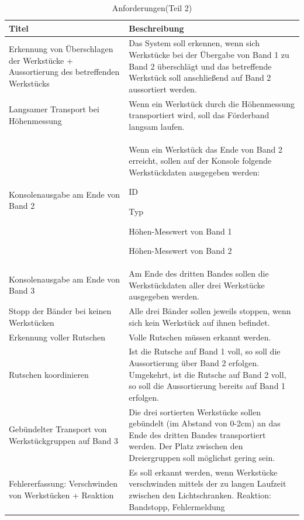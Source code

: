 \documentclass[a4paper, 11pt]{article}
\begin{document}
\newpage

\begin{table}[h]
\center
\begin{tabularx}{\textwidth}{|X|X|}
\hline
\textbf{Titel}&\textbf{Beschreibung}\\
\hline
Erkennung von Überschlagen der Werkstücke + Aussortierung des betreffenden Werkstücks&Das System soll erkennen, wenn sich Werkstücke bei der Übergabe von Band 1 zu Band 2 überschlägt und das betreffende Werkstück soll anschließend auf Band 2 aussortiert werden.\\
\hline
Langsamer Transport bei Höhenmessung&Wenn ein Werkstück durch die Höhenmessung transportiert wird, soll das Förderband langsam laufen.\\
\hline
Konsolenausgabe am Ende von Band 2&Wenn ein Werkstück das Ende von Band 2 erreicht, sollen auf der Konsole folgende Werkstückdaten ausgegeben werden:
\begin{compactenum}[-]
\item ID 
\item Typ 
\item Höhen-Messwert von Band 1 
\item Höhen-Messwert von Band 2 
\end{compactenum}\\
\hline
Konsolenausgabe am Ende von Band 3&Am Ende des dritten Bandes sollen die Werkstückdaten aller drei Werkstücke ausgegeben werden.\\
\hline
Stopp der Bänder bei keinen Werkstücken&Alle drei Bänder sollen jeweils stoppen, wenn sich kein Werkstück auf ihnen befindet.\\
\hline
Erkennung voller Rutschen&Volle Rutschen müssen erkannt werden.\\
\hline
Rutschen koordinieren&Ist die Rutsche auf Band 1 voll, so soll die Aussortierung über Band 2 erfolgen. Umgekehrt, ist die Rutsche auf Band 2 voll, so soll die Aussortierung bereits auf Band 1 erfolgen.\\
\hline
Gebündelter Transport von Werkstückgruppen auf Band 3&Die drei sortierten Werkstücke sollen gebündelt (im Abstand von 0-2cm) an das Ende des dritten Bandes transportiert werden. Der Platz zwischen den Dreiergruppen soll möglichst gering sein.\\
\hline
Fehlererfassung: Verschwinden von Werkstücken + Reaktion&Es soll erkannt werden, wenn Werkstücke verschwinden mittels der zu langen Laufzeit zwischen den Lichtschranken. Reaktion: Bandstopp, Fehlermeldung\\
\hline
\end{tabularx}
\caption{Anforderungen(Teil 2)}
\label{anf2}
\end{table}
\end{document}
